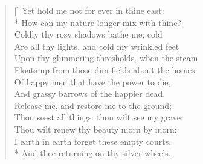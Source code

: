 \documentclass[MAIN]{subfiles}
\begin{document}
\begin{verse}[\versewidth]
Yet hold me not for ever in thine east:\\* 
How can my nature longer mix with thine?\\
Coldly thy rosy shadows bathe me, cold\\
Are all thy lights, and cold my wrinkled feet\\
Upon thy glimmering thresholds, when the steam\\
Floats up from those dim fields about the homes\\
Of happy men that have the power to die,\\
And grassy barrows of the happier dead.\\
Release me, and restore me to the ground;\\
Thou seest all things: thou wilt see my grave:\\
Thou wilt renew thy beauty morn by morn;\\
I earth in earth forget these empty courts,\\*
And thee returning on thy silver wheels.
\end{verse}
\end{document}
